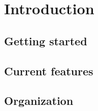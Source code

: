 \chapter{Introduction}
\label{chap:introduction}


	\section{Getting started}
	\label{sec:installation}
	

	\section{Current features}
	\label{sec:features}
	

	\section{Organization}
	\label{sec:organization}
	